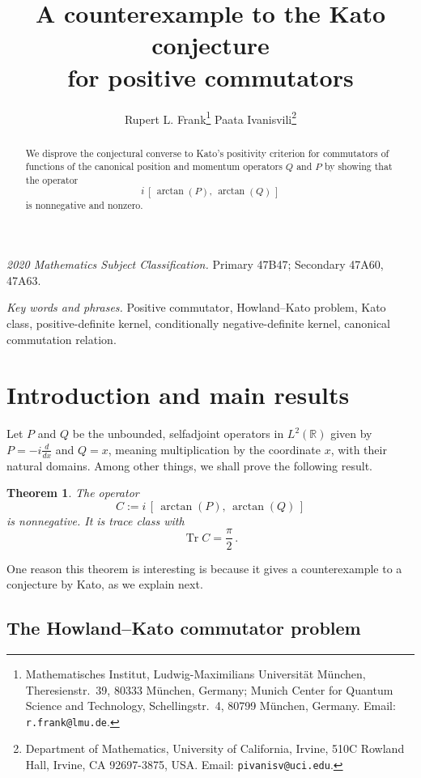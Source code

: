 \documentclass[11pt]{article}
\title{A counterexample to the Kato conjecture\\for positive commutators}
\author{Rupert L. Frank\thanks{Mathematisches Institut, Ludwig-Maximilians Universit\"at M\"unchen, Theresienstr.~39, 80333 M\"unchen, Germany; Munich Center for Quantum Science and Technology, Schellingstr.~4, 80799 M\"unchen, Germany. Email: \texttt{r.frank@lmu.de}.}
\qquad
Paata Ivanisvili\thanks{Department of Mathematics, University of California, Irvine, 510C Rowland Hall, Irvine, CA 92697-3875, USA. Email: \texttt{pivanisv@uci.edu}.}}
\date{\version}
\newtheorem{theorem}{Theorem}
\theoremstyle{definition}
\theoremstyle{remark}
\newcommand{\R}{\mathbb{R}}
\begin{document}
\maketitle

\begin{abstract}
We disprove the conjectural converse to Kato's positivity criterion for commutators of functions of the canonical position and momentum operators $Q$ and $P$ by showing that the operator
\[
i\,[\,\arctan(P),\,\arctan(Q)\,]
\]
is nonnegative and nonzero.
\end{abstract}

\noindent\emph{2020 Mathematics Subject Classification.} Primary 47B47; Secondary 47A60, 47A63.

\noindent\emph{Key words and phrases.} Positive commutator, Howland--Kato problem, Kato class, positive-definite kernel, conditionally negative-definite kernel, canonical commutation relation.


\section{Introduction and main results}

Let $P$ and $Q$ be the unbounded, selfadjoint operators in $L^2(\R)$ given by $P=-i\frac{d}{dx}$ and $Q=x$, meaning multiplication by the coordinate $x$, with their natural domains. Among other things, we shall prove the following result.

\begin{theorem}\label{thm:main}
The operator
\begin{equation}\label{eq:main-positive}
C:=i\,[\,\arctan(P),\,\arctan(Q)\,]
\end{equation}
is nonnegative. It is trace class with
\begin{equation}\label{eq:trace-main}
\operatorname{Tr} C=\frac{\pi}{2} \,.
\end{equation}
\end{theorem}

One reason this theorem is interesting is because it gives a counterexample to a conjecture by Kato, as we explain next.


\subsection*{The Howland--Kato commutator problem}
\end{document}
